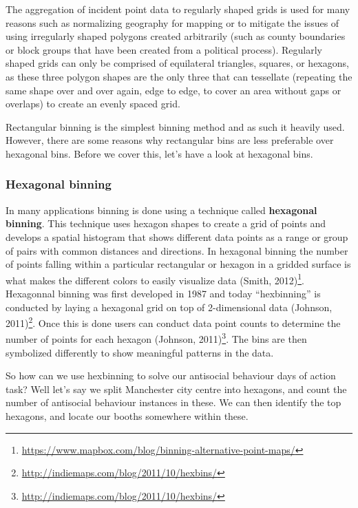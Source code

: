 \documentclass[
  krantz2]{krantz}
\renewcommand{\href}[2]{#2\footnote{\url{#1}}}
\begin{document}
The aggregation of incident point data to regularly shaped grids is used for many reasons such as normalizing geography for mapping or to mitigate the issues of using irregularly shaped polygons created arbitrarily (such as county boundaries or block groups that have been created from a political process). Regularly shaped grids can only be comprised of equilateral triangles, squares, or hexagons, as these three polygon shapes are the only three that can tessellate (repeating the same shape over and over again, edge to edge, to cover an area without gaps or overlaps) to create an evenly spaced grid.

Rectangular binning is the simplest binning method and as such it heavily used. However, there are some reasons why rectangular bins are less preferable over hexagonal bins. Before we cover this, let's have a look at hexagonal bins.

\hypertarget{hexagonal-binning}{%
\subsubsection{Hexagonal binning}\label{hexagonal-binning}}

In many applications binning is done using a technique called \textbf{hexagonal binning}. This technique uses hexagon shapes to create a grid of points and develops a spatial histogram that shows different data points as a range or group of pairs with common distances and directions. In hexagonal binning the number of points falling within a particular rectangular or hexagon in a gridded surface is what makes the different colors to easily visualize data \href{https://www.mapbox.com/blog/binning-alternative-point-maps/}{(Smith, 2012)}. Hexagonnal binning was first developed in 1987 and today ``hexbinning'' is conducted by laying a hexagonal grid on top of 2-dimensional data \href{http://indiemaps.com/blog/2011/10/hexbins/}{(Johnson, 2011)}. Once this is done users can conduct data point counts to determine the number of points for each hexagon \href{http://indiemaps.com/blog/2011/10/hexbins/}{(Johnson, 2011)}. The bins are then symbolized differently to show meaningful patterns in the data.

So how can we use hexbinning to solve our antisocial behaviour days of action task? Well let's say we split Manchester city centre into hexagons, and count the number of antisocial behaviour instances in these. We can then identify the top hexagons, and locate our booths somewhere within these.
\end{document}

